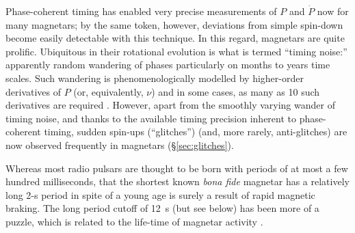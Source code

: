 Phase-coherent timing has enabled very precise measurements of $P$ and $\dot{P}$ 
now for many magnetars; by the
same token, however, deviations from simple spin-down become easily detectable with this technique.
In this regard, magnetars are quite prolific.  Ubiquitous in their rotational evolution is what is termed
``timing noise:'' apparently random wandering of phases particularly
on months to years time scales.  Such wandering is phenomenologically modelled by higher-order derivatives
of $P$ (or, equivalently, $\nu$) and in some cases, as many as 10 such derivatives are required \citep[e.g.][]{dk14}.
However, apart from the smoothly varying wander of timing noise,
and thanks to the available timing precision inherent to phase-coherent timing, 
sudden spin-ups (``glitches'') (and, more rarely, anti-glitches) are now observed frequently in magnetars
(\S\ref{sec:glitches}).


Whereas most radio pulsars are thought to be born with periods
of at most a few hundred milliseconds, that the shortest known {\it bona fide} magnetar
has a relatively long 2-s period in spite of a young age 
is surely a result of rapid magnetic braking. 
The long period cutoff of 12~s (but see below) has been more of a puzzle, which is related to the life-time
of magnetar activity \citep[e.g.][]{cgp00,vrp+13}.  


